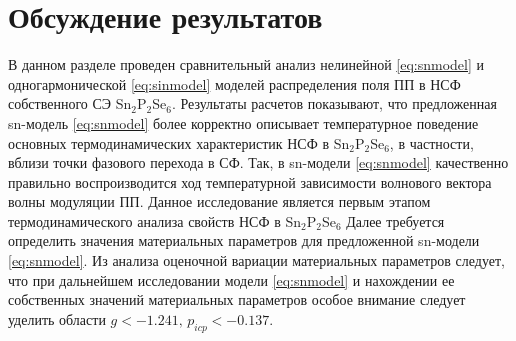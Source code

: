 \section{Обсуждение результатов}\label{sec:discuss}

В данном разделе проведен сравнительный анализ нелинейной \eqref{eq:snmodel} и одногармонической \eqref{eq:sinmodel} моделей распределения поля ПП в НСФ собственного СЭ Sn$_2$P$_2$Se$_6$. Результаты расчетов показывают, что предложенная sn-модель \eqref{eq:snmodel} более корректно описывает температурное поведение основных термодинамических характеристик НСФ в Sn$_2$P$_2$Se$_6$, в частности, вблизи точки фазового перехода в СФ. Так, в sn-модели \eqref{eq:snmodel} качественно правильно воспроизводится ход температурной зависимости волнового вектора волны модуляции ПП.
Данное исследование является первым этапом термодинамического анализа свойств НСФ в Sn$_2$P$_2$Se$_6$ Далее требуется определить значения материальных параметров для предложенной sn-модели \eqref{eq:snmodel}. Из анализа оценочной вариации материальных параметров следует, что при дальнейшем исследовании модели \eqref{eq:snmodel} и нахождении ее собственных значений материальных параметров особое внимание следует уделить области $g < -1.241,\, p_{icp} < -0.137$.
